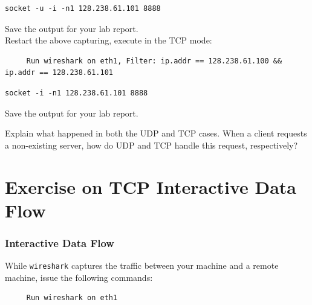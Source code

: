 \documentclass{UTNetLab}
\begin{document}
    \begin{lstlisting}[emph={h0,h1,netlab}]
    socket -u -i -n1 128.238.61.101 8888
    \end{lstlisting}
    
    {Save} the  output for your lab report. \\
    Restart the above  capturing, execute  in the TCP mode:
    
     \begin{lstlisting}
     Run wireshark on eth1, Filter: ip.addr == 128.238.61.100 && ip.addr == 128.238.61.101

     \end{lstlisting}  
       
    \begin{lstlisting}[emph={h1,netlab}]
    socket -i -n1 128.238.61.101 8888
    \end{lstlisting}       
        
    {Save} the  output for your lab report.    
    
   \begin{report}
        \item Explain what happened in both the UDP and TCP cases.
                When a client requests a non-existing server, how do UDP and TCP handle this request, respectively?
    \end{report}

\part{Exercise on TCP Interactive Data Flow}
\section{Interactive Data Flow}
			
	While \lstinline{wireshark} captures the traffic between your machine and a remote machine, issue the following commands:
	
     \begin{lstlisting}
     Run wireshark on eth1

     \end{lstlisting}  
	
\end{document}
